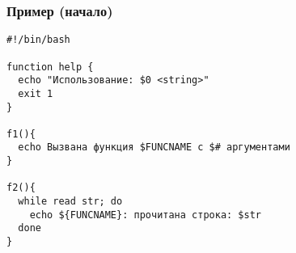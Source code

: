\begin{frame}[fragile]
	\frametitle{Пример (начало)}
	\small
	\begin{lstlisting}
#!/bin/bash

function help {
  echo "Использование: $0 <string>"
  exit 1
}

f1(){
  echo Вызвана функция $FUNCNAME с $# аргументами
}

f2(){
  while read str; do
    echo ${FUNCNAME}: прочитана строка: $str
  done
}
\end{lstlisting}

\end{frame}
